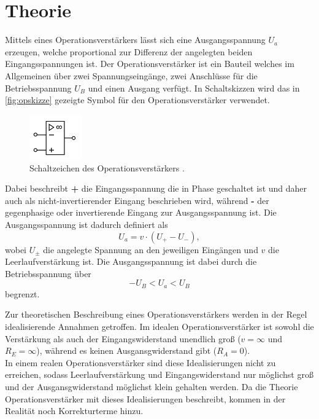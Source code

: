 \section{Theorie}
\label{sec:theorie}
Mittels eines Operationsverstärkers lässt sich eine Ausgangsspannung $U_a$ erzeugen, welche 
proportional zur Differenz der angelegten beiden Eingangsspannungen ist. 
Der Operationsverstärker ist ein Bauteil welches im Allgemeinen über zwei Spannungseingänge, zwei Anschlüsse 
für die Betriebsspannung $U_B$ und einen Ausgang 
verfügt. In Schaltskizzen wird 
das in \autoref{fig:opskizze} gezeigte Symbol für den Operationsverstärker verwendet.
\begin{figure}[H]
    \centering
    \includegraphics[width=0.2\textwidth]{op.png}
    \caption{Schaltzeichen des Operationsverstärkers \cite{anleitung}.}
    \label{fig:opskizze}
\end{figure}
Dabei beschreibt 
\textbf{+} die Eingangsspannung die in Phase geschaltet ist und daher auch als nicht-invertierender
Eingang beschrieben wird, während \textbf{-} der gegenphasige oder invertierende Eingang 
zur Ausgangsspannung ist. Die Ausgangsspannung ist dadurch definiert als 
\begin{equation*}
    U_a = v \cdot  (U_+ - U_-),
\end{equation*}
wobei $U_{\pm}$ die angelegte Spannung an den jeweiligen Eingängen und $v$ die Leerlaufverstärkung ist.
Die Ausgangsspannung ist dabei durch die Betriebsspannung über 
\begin{equation*}
    - U_B < U_a < U_B
\end{equation*}
begrenzt.

Zur theoretischen Beschreibung eines Operationsverstärkers werden in der Regel idealisierende 
Annahmen getroffen. Im idealen Operationsverstärker ist sowohl die Verstärkung als auch 
der Eingangswiderstand unendlich groß ($v = \infty$ und $R_E = \infty$),
während es keinen Ausgansgwiderstand gibt ($R_A = 0$). \\
In einem realen Operationsverstärker sind diese Idealisierungen nicht zu erreichen, sodass 
Leerlaufverstärkung und Eingangswiderstand nur möglichst groß und der Ausgansgwiderstand möglichst 
klein gehalten werden. Da die Theorie Operationsverstärker mit dieses Idealisierungen beschreibt, 
kommen in der Realität noch Korrekturterme hinzu.


